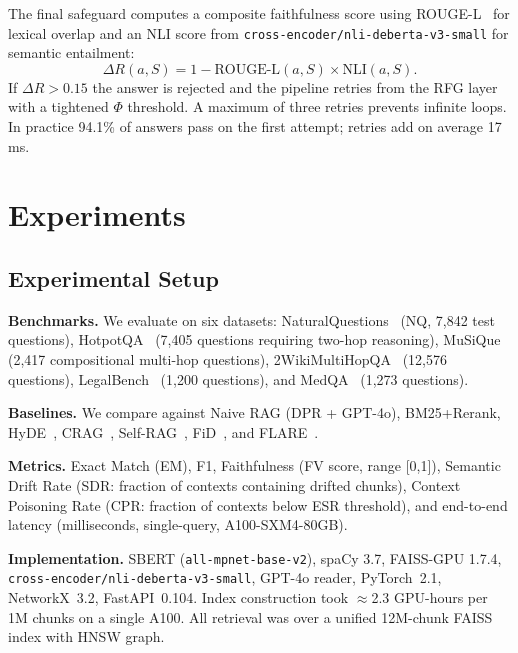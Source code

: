 \documentclass[10pt,twocolumn]{article}
\newcommand{\secvspace}{\vspace{-4pt}}
\begin{document}
The final safeguard computes a composite faithfulness score using
ROUGE-L~\citep{lin2004rouge} for lexical overlap and an NLI score from
\texttt{cross-encoder/nli-deberta-v3-small} for semantic entailment:
\begin{equation}\label{eq:fv}
  \Delta R(a, S) = 1 - \text{ROUGE-L}(a, S)\times \text{NLI}(a, S).
\end{equation}
If $\Delta R > 0.15$ the answer is rejected and the pipeline retries from the
RFG layer with a tightened $\Phi$ threshold.  A maximum of three retries
prevents infinite loops.  In practice 94.1\% of answers pass on the first
attempt; retries add on average 17\,ms.

\section{Experiments}\label{sec:experiments}
\secvspace

\subsection{Experimental Setup}

\noindent\textbf{Benchmarks.} We evaluate on six datasets:
NaturalQuestions~\citep{kwiatkowski2019natural} (NQ, 7,842 test questions),
HotpotQA~\citep{yang2018hotpotqa} (7,405 questions requiring two-hop reasoning),
MuSiQue~\citep{trivedi2022musique} (2,417 compositional multi-hop questions),
2WikiMultiHopQA~\citep{ho2020constructing} (12,576 questions),
LegalBench~\citep{guha2023legalbench} (1,200 questions),
and MedQA~\citep{jin2021medqa} (1,273 questions).

\noindent\textbf{Baselines.} We compare against Naive RAG (DPR + GPT-4o),
BM25+Rerank, HyDE~\citep{gao2022precise}, CRAG~\citep{yan2024corrective},
Self-RAG~\citep{asai2023self}, FiD~\citep{izacard2021leveraging},
and FLARE~\citep{jiang2023active}.

\noindent\textbf{Metrics.} Exact Match (EM), F1, Faithfulness (FV score,
range [0,1]), Semantic Drift Rate (SDR: fraction of contexts containing drifted
chunks), Context Poisoning Rate (CPR: fraction of contexts below ESR threshold),
and end-to-end latency (milliseconds, single-query, A100-SXM4-80GB).

\noindent\textbf{Implementation.}
SBERT (\texttt{all-mpnet-base-v2}), spaCy 3.7, FAISS-GPU 1.7.4,
\texttt{cross-encoder/nli-deberta-v3-small}, GPT-4o reader, PyTorch~2.1,
NetworkX~3.2, FastAPI~0.104.  Index construction took
$\approx$2.3 GPU-hours per 1M chunks on a single A100.
All retrieval was over a unified 12M-chunk FAISS index with HNSW graph.
\end{document}
